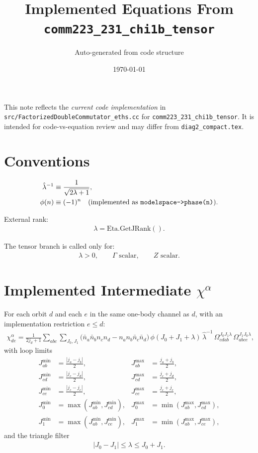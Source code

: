 \documentclass{article}
\title{Implemented Equations From \texttt{comm223\_231\_chi1b\_tensor}}
\author{Auto-generated from code structure}
\date{\today}
\begin{document}
\maketitle

This note reflects the \emph{current code implementation} in
\texttt{src/FactorizedDoubleCommutator\_eths.cc} for
\texttt{comm223\_231\_chi1b\_tensor}.
It is intended for code-vs-equation review and may differ from
\texttt{diag2\_compact.tex}.

\section*{Conventions}
\begin{align}
\hat\lambda^{-1} &\equiv \frac{1}{\sqrt{2\lambda+1}}, \\
\phi(n) &\equiv (-1)^n \quad \text{(implemented as \texttt{modelspace->phase(n)}).}
\end{align}

External rank:
\begin{align}
\lambda = \mathrm{Eta.GetJRank()}.
\end{align}

The tensor branch is called only for:
\begin{align}
\lambda>0,\qquad \Gamma \text{ scalar},\qquad Z \text{ scalar}.
\end{align}

\section*{Implemented Intermediate $\chi^\alpha$}
For each orbit $d$ and each $e$ in the same one-body channel as $d$,
with an implementation restriction $e\le d$:
\begin{align}
\chi^{\alpha}_{de}
=\frac{1}{2j_d+1}
\sum_{abc}
\sum_{J_0,J_1}
\Big(
\bar n_a\bar n_b n_c n_d - n_a n_b \bar n_c \bar n_d
\Big)
\,\phi(J_0+J_1+\lambda)
\,\hat\lambda^{-1}
\,\Omega^{J_0J_1\lambda}_{cdab}
\,\Omega^{J_1J_0\lambda}_{abce},
\end{align}
with loop limits
\begin{align}
J_{ab}^{\min} &= \frac{|j_a-j_b|}{2}, & J_{ab}^{\max} &= \frac{j_a+j_b}{2},\\
J_{cd}^{\min} &= \frac{|j_c-j_d|}{2}, & J_{cd}^{\max} &= \frac{j_c+j_d}{2},\\
J_{ce}^{\min} &= \frac{|j_c-j_e|}{2}, & J_{ce}^{\max} &= \frac{j_c+j_e}{2},\\
J_0^{\min} &= \max(J_{ab}^{\min},J_{cd}^{\min}), & J_0^{\max} &= \min(J_{ab}^{\max},J_{cd}^{\max}),\\
J_1^{\min} &= \max(J_{ab}^{\min},J_{ce}^{\min}), & J_1^{\max} &= \min(J_{ab}^{\max},J_{ce}^{\max}),
\end{align}
and the triangle filter
\begin{align}
|J_0-J_1|\le \lambda \le J_0+J_1.
\end{align}
\end{document}

